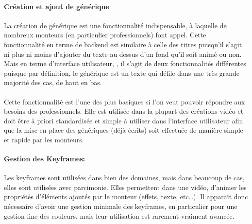 \paragraph{Création et ajout de générique}

\paragraph{}

La création de générique est une fonctionnalité indispensable, à laquelle de
nombreux monteurs (en particulier professionnels) font appel. Cette
fonctionnalité en terme de backend est similaire à
celle des titres puisqu'il s'agit ni plus ni moins d'ajouter du
texte au dessus d'un fond qu'il soit animé ou non. Mais en terme d'interface utilisateur,
,
il s'agit de deux fonctionnalités différentes puisque par définition,
le générique est un texte qui défile dans une très grande majorité
des cas, de haut en bas.

\paragraph{}

Cette fonctionnalité est l'une des plus basiques si
l'on veut pouvoir répondre aux besoins des professionnels. Elle est utilisée
dans la plupart des créations vidéo et doit être à priori standardisée et
simple à utiliser dans l'interface utilisateur afin que la mise en place
des génériques (déjà écrits) soit effectuée de manière simple et rapide
par les monteurs.

\paragraph{Gestion des Keyframes:}

\paragraph{}

Les keyframes sont utilisées dans bien des domaines, mais dans beaucoup de cas, elles sont
utilisées avec parcimonie. Elles permettent dans une vidéo, d'animer les propriétés
d'éléments ajoutés par le monteur (effets, texte, etc\ldots). Il
apparaît donc nécessaire d'avoir une gestion minimale des keyframes,
en particulier pour une gestion fine des couleurs, mais leur utilisation est
rarement vraiment avancée.

